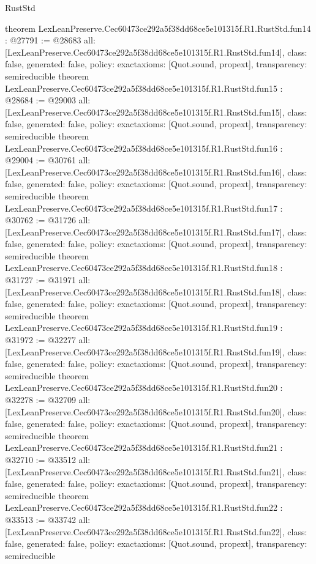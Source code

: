 \begin{lexlean}{RustStd}
\begin{coremodule}
{}
theorem LexLeanPreserve.Cec60473ce292a5f38dd68ce5e101315f.R1.RustStd.fun14 : @27791 := @28683 {
  all: [LexLeanPreserve.Cec60473ce292a5f38dd68ce5e101315f.R1.RustStd.fun14],
  class: false,
  generated: false,
  policy: exact{axioms: [Quot.sound, propext]},
  transparency: semireducible
}
theorem LexLeanPreserve.Cec60473ce292a5f38dd68ce5e101315f.R1.RustStd.fun15 : @28684 := @29003 {
  all: [LexLeanPreserve.Cec60473ce292a5f38dd68ce5e101315f.R1.RustStd.fun15],
  class: false,
  generated: false,
  policy: exact{axioms: [Quot.sound, propext]},
  transparency: semireducible
}
theorem LexLeanPreserve.Cec60473ce292a5f38dd68ce5e101315f.R1.RustStd.fun16 : @29004 := @30761 {
  all: [LexLeanPreserve.Cec60473ce292a5f38dd68ce5e101315f.R1.RustStd.fun16],
  class: false,
  generated: false,
  policy: exact{axioms: [Quot.sound, propext]},
  transparency: semireducible
}
theorem LexLeanPreserve.Cec60473ce292a5f38dd68ce5e101315f.R1.RustStd.fun17 : @30762 := @31726 {
  all: [LexLeanPreserve.Cec60473ce292a5f38dd68ce5e101315f.R1.RustStd.fun17],
  class: false,
  generated: false,
  policy: exact{axioms: [Quot.sound, propext]},
  transparency: semireducible
}
theorem LexLeanPreserve.Cec60473ce292a5f38dd68ce5e101315f.R1.RustStd.fun18 : @31727 := @31971 {
  all: [LexLeanPreserve.Cec60473ce292a5f38dd68ce5e101315f.R1.RustStd.fun18],
  class: false,
  generated: false,
  policy: exact{axioms: [Quot.sound, propext]},
  transparency: semireducible
}
theorem LexLeanPreserve.Cec60473ce292a5f38dd68ce5e101315f.R1.RustStd.fun19 : @31972 := @32277 {
  all: [LexLeanPreserve.Cec60473ce292a5f38dd68ce5e101315f.R1.RustStd.fun19],
  class: false,
  generated: false,
  policy: exact{axioms: [Quot.sound, propext]},
  transparency: semireducible
}
theorem LexLeanPreserve.Cec60473ce292a5f38dd68ce5e101315f.R1.RustStd.fun20 : @32278 := @32709 {
  all: [LexLeanPreserve.Cec60473ce292a5f38dd68ce5e101315f.R1.RustStd.fun20],
  class: false,
  generated: false,
  policy: exact{axioms: [Quot.sound, propext]},
  transparency: semireducible
}
theorem LexLeanPreserve.Cec60473ce292a5f38dd68ce5e101315f.R1.RustStd.fun21 : @32710 := @33512 {
  all: [LexLeanPreserve.Cec60473ce292a5f38dd68ce5e101315f.R1.RustStd.fun21],
  class: false,
  generated: false,
  policy: exact{axioms: [Quot.sound, propext]},
  transparency: semireducible
}
theorem LexLeanPreserve.Cec60473ce292a5f38dd68ce5e101315f.R1.RustStd.fun22 : @33513 := @33742 {
  all: [LexLeanPreserve.Cec60473ce292a5f38dd68ce5e101315f.R1.RustStd.fun22],
  class: false,
  generated: false,
  policy: exact{axioms: [Quot.sound, propext]},
  transparency: semireducible
}
\end{coremodule}
\end{lexlean}
